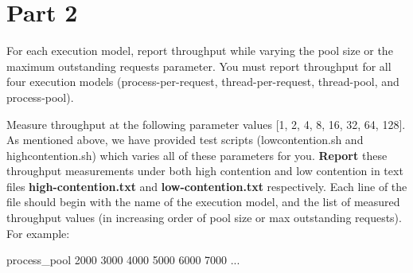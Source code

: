 \documentclass[11pt]{article}
\begin{document}
\section{Part 2}
For each execution model, report throughput while varying the pool size or the maximum outstanding requests parameter. You must report throughput for all four execution models (process-per-request, thread-per-request, thread-pool, and process-pool). 


Measure throughput at the following parameter values [1, 2, 4, 8, 16, 32, 64, 128]. As mentioned above, we have provided test scripts (lowcontention.sh and highcontention.sh) which varies all of these parameters for you. \textbf{Report} these throughput measurements under both high contention and low contention in text files \textbf{high-contention.txt} and \textbf{low-contention.txt} respectively. Each line of the file should begin with the name of the execution model, and the list of measured throughput values (in increasing order of pool size or max outstanding requests). For example:

\begin{center}
process\_pool 2000 3000 4000 5000 6000 7000 ...
\end{center}
\end{document}

